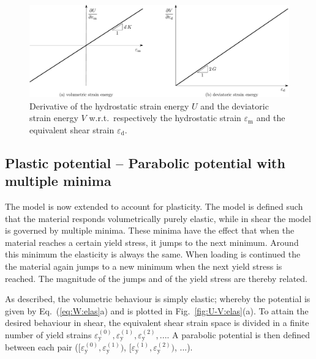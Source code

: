\documentclass[times,namecite]{goose-article}
\begin{document}
\begin{figure}[htp]
  \centering
  \includegraphics[width=1.\textwidth]{figures/potential_dU-dV_elas}
  \caption{Derivative of the hydrostatic strain energy $U$ and the deviatoric strain energy $V$ w.r.t.\ respectively the hydrostatic strain $\varepsilon_\mathrm{m}$ and the equivalent shear strain $\varepsilon_\mathrm{d}$.}
  \label{fig:dU-dV:elas}
\end{figure}

\subsection{Plastic potential -- Parabolic potential with multiple minima}

The model is now extended to account for plasticity. The model is defined such that the material responds volumetrically purely elastic, while in shear the model is governed by multiple minima. These minima have the effect that when the material reaches a certain yield stress, it jumps to the next minimum. Around this minimum the elasticity is always the same. When loading is continued the the material again jumps to a new minimum when the next yield stress is reached. The magnitude of the jumps and of the yield stress are thereby related.

As described, the volumetric behaviour is simply elastic; whereby the potential is given by Eq.~(\ref{eq:W:elas}a) and is plotted in Fig.~\ref{fig:U-V:elas}(a). To attain the desired behaviour in shear, the equivalent shear strain space is divided in a finite number of yield strains $\varepsilon_\mathrm{y}^{(0)}, \varepsilon_\mathrm{y}^{(1)}, \varepsilon_\mathrm{y}^{(2)}, ...$. A parabolic potential is then defined between each pair ($[ \varepsilon_\mathrm{y}^{(0)}, \varepsilon_\mathrm{y}^{(1)} )$, $[ \varepsilon_\mathrm{y}^{(1)}, \varepsilon_\mathrm{y}^{(2)} )$, ...).
\end{document}
